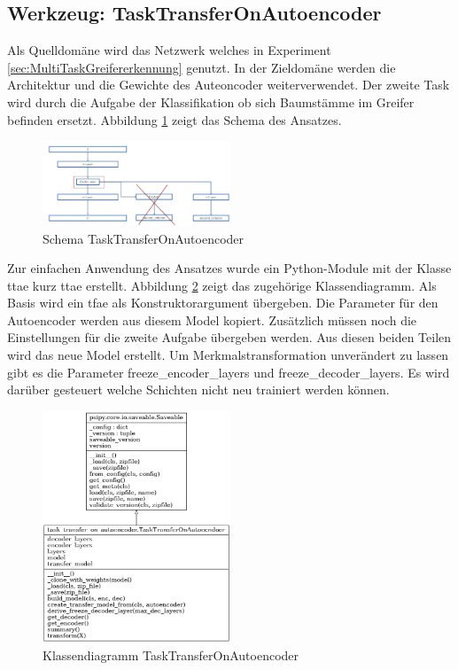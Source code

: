 	\subsection{Werkzeug: TaskTransferOnAutoencoder}
	\label{sec:TransferSecondCriterionAutoenocder}		
	Als Quelldomäne wird das Netzwerk welches in Experiment \ref{sec:MultiTaskGreifererkennung} genutzt. In der Zieldomäne werden die Architektur und die Gewichte des Auteoncoder weiterverwendet. Der zweite Task wird durch die Aufgabe der Klassifikation ob sich Baumstämme im Greifer befinden ersetzt. Abbildung \ref{img:SchemaTTAE} zeigt das Schema des Ansatzes. 
	\begin{figure}[h]
		\centering
		\includegraphics[width=0.5\textwidth, center]{bilder/Schema_Autoencoders/Schema_TSCAE.png}
		\caption[Schema TaskTransferOnAutoencoder]{Schema TaskTransferOnAutoencoder}
		\label{img:SchemaTTAE}
	\end{figure}
	Zur einfachen Anwendung des Ansatzes wurde ein Python-Module mit der Klasse \acl{ttae} kurz \ac{ttae} erstellt. Abbildung \ref{img:KlassendiagrammTransferSecondCriterionAutoenocder} zeigt das zugehörige Klassendiagramm. Als Basis wird ein \ac{tfae} als Konstruktorargument übergeben. Die Parameter für den Autoencoder werden aus diesem Model kopiert. Zusätzlich müssen noch die Einstellungen für die zweite Aufgabe übergeben werden. Aus diesen beiden Teilen wird das neue Model erstellt. Um Merkmalstransformation unverändert zu lassen gibt es die Parameter freeze\_encoder\_layers und freeze\_decoder\_layers. Es wird darüber gesteuert welche Schichten nicht neu trainiert werden können. 
	\begin{figure}[h]
		\centering
		\includegraphics[width=0.5\textwidth, center]{bilder/Klassendiagramme/TTAE.png}
		\caption[Klassendiagramm TaskTransferOnAutoencoder]{Klassendiagramm TaskTransferOnAutoencoder}
		\label{img:KlassendiagrammTransferSecondCriterionAutoenocder}
	\end{figure}  
